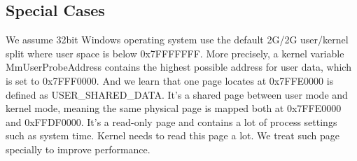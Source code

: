 

\subsection{Special Cases}
We assume 32bit Windows operating system use the default 2G/2G user/kernel split where user space is below 0x7FFFFFFF. More precisely, a kernel variable MmUserProbeAddress contains the highest possible address for user data, which is set to 0x7FFF0000. And we learn that one page locates at 0x7FFE0000 is defined as USER\_SHARED\_DATA. It's a shared page between user mode and kernel mode, meaning the same physical page is mapped both at 0x7FFE0000 and 0xFFDF0000. It's a read-only page and contains a lot of process settings such as system time. Kernel needs to read this page a lot. We treat such page specially to improve performance. 


